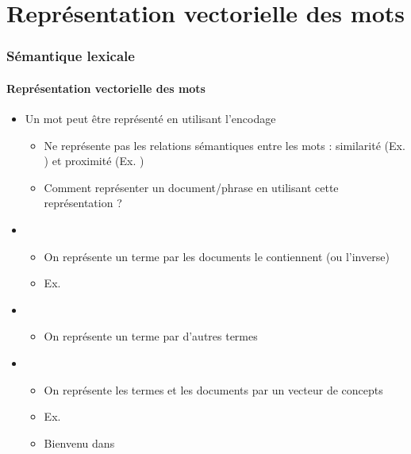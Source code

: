\documentclass[xcolor=table]{beamer}
\begin{document}
\section{Représentation vectorielle des mots}

\begin{frame}
\frametitle{Sémantique lexicale}
\framesubtitle{Représentation vectorielle des mots}

\begin{itemize}
	\item Un mot peut être représenté en utilisant l'encodage  
	\begin{itemize}
		\item Ne représente pas les relations sémantiques entre les mots : similarité (Ex. ) et proximité (Ex. )
		\item Comment représenter un document/phrase en utilisant cette représentation ?
	\end{itemize}

	\item {}
	\begin{itemize}
		\item On représente un terme par les documents le contiennent (ou l'inverse)
		\item Ex. 
	\end{itemize}

	\item {}
	\begin{itemize}
		\item On représente un terme par d'autres termes
	\end{itemize}

	\item {}
	\begin{itemize}
		\item On représente les termes et les documents par un vecteur de concepts
		\item Ex. 
		\item Bienvenu dans 
	\end{itemize}

\end{itemize}

\end{frame}
\end{document}

